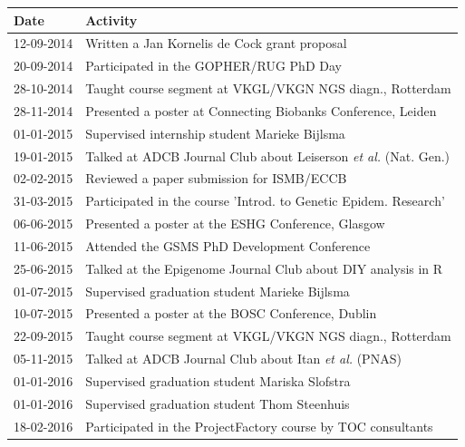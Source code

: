 \begin{appendices}
\begin{table}
\footnotesize
\begin{tabulary}{\linewidth}{LL}
  Date & Activity \\
  \hline
  \rule{0pt}{2.5ex}\mbox{12-09-2014} & Written a Jan Kornelis de Cock grant proposal \\
  \rule{0pt}{2.5ex}\mbox{20-09-2014} & Participated in the GOPHER/RUG PhD Day \\
  \rule{0pt}{2.5ex}\mbox{28-10-2014} & Taught course segment at VKGL/VKGN NGS diagn., Rotterdam \\
  \rule{0pt}{2.5ex}\mbox{28-11-2014} & Presented a poster at Connecting Biobanks Conference, Leiden \\
  \rule{0pt}{2.5ex}\mbox{01-01-2015} & Supervised internship student Marieke Bijlsma \\
  \rule{0pt}{2.5ex}\mbox{19-01-2015} & Talked at ADCB Journal Club about Leiserson \textsl{et al.} (Nat. Gen.) \\
  \rule{0pt}{2.5ex}\mbox{02-02-2015} & Reviewed a paper submission for ISMB/ECCB \\
  \rule{0pt}{2.5ex}\mbox{31-03-2015} & Participated in the course 'Introd. to Genetic Epidem. Research' \\
  \rule{0pt}{2.5ex}\mbox{06-06-2015} & Presented a poster at the ESHG Conference, Glasgow \\
  \rule{0pt}{2.5ex}\mbox{11-06-2015} & Attended the GSMS PhD Development Conference \\
  \rule{0pt}{2.5ex}\mbox{25-06-2015} & Talked at the Epigenome Journal Club about DIY analysis in R \\
  \rule{0pt}{2.5ex}\mbox{01-07-2015} & Supervised graduation student Marieke Bijlsma \\
  \rule{0pt}{2.5ex}\mbox{10-07-2015} & Presented a poster at the BOSC Conference, Dublin \\
  \rule{0pt}{2.5ex}\mbox{22-09-2015} & Taught course segment at VKGL/VKGN NGS diagn., Rotterdam \\
  \rule{0pt}{2.5ex}\mbox{05-11-2015} & Talked at ADCB Journal Club about Itan \textsl{et al.} (PNAS) \\
  \rule{0pt}{2.5ex}\mbox{01-01-2016} & Supervised graduation student Mariska Slofstra \\
  \rule{0pt}{2.5ex}\mbox{01-01-2016} & Supervised graduation student Thom Steenhuis \\
  \rule{0pt}{2.5ex}\mbox{18-02-2016} & Participated in the ProjectFactory course by TOC consultants \\

\end{tabulary}
\end{table}
\end{appendices}
